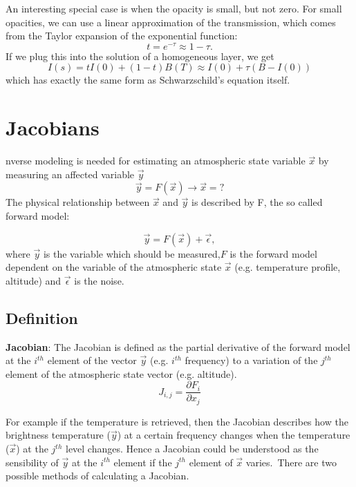 An interesting special case is when the opacity is small, but not zero. For small opacities, 
we can use a linear approximation of the transmission, which comes from the Taylor expansion
of the exponential function:
\begin{equation}
	t = e^{-\tau} \approx 1 - \tau.
\end{equation}
If we plug this into the solution of a homogeneous layer, we get
\begin{equation}
	I(s) = t I(0)  + \left( 1-t \right) B(T) \approx I(0) + \tau \left( B - I(0)\right)
\end{equation}
which has exactly the same form as Schwarzschild's equation itself.

\section{Jacobians}
 nverse modeling is needed for estimating an atmospheric state variable
$\vec{x}$ by measuring an affected variable $\vec{y}$
\begin{equation*}
\vec{y}=F(\vec{x}) \rightarrow \vec{x}=?
\end{equation*}
The physical relationship between $\vec{x}$ and $\vec{y}$ is described by F, the
so called forward model:

\begin{equation*}
\vec{y}=F(\vec{x})+\vec{\epsilon},
\end{equation*}
where $\vec{y}$ is the variable which should be measured,$F$ is the forward
model dependent on the variable of the atmospheric state $\vec{x}$ (e.g.
temperature profile, altitude)  and $\vec{\epsilon}$ is the noise.\\

\subsection*{Definition}
\textbf{Jacobian}:
The Jacobian is defined as the partial derivative of the forward model at the
$i^{th}$ element of the vector $\vec{y}$ (e.g. $i^{th}$ frequency) to a
variation of the $j^{th}$ element of the atmospheric state vector (e.g.
altitude).
\begin{equation*}
J_{i,j}=\frac{\partial F_i}{\partial x_j}
\end{equation*}

For example if the temperature is retrieved, then the Jacobian describes how
the brightness temperature ($\vec{y}$) at a certain frequency changes when the
temperature ($\vec{x}$) at the $j^{th}$ level changes.
Hence a Jacobian could be understood as the sensibility of $\vec{y}$ at the
$i^{th}$ element if the $j^{th}$ element of $\vec{x}$ varies.\
There are two possible methods of calculating a Jacobian.

